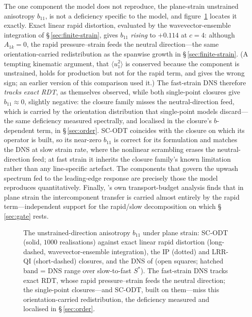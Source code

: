 \documentclass[11pt,a4paper]{article}
\begin{document}
The one component the model does not reproduce, the plane-strain
unstrained anisotropy $b_{11}$, is not a deficiency specific to the
model, and figure~\ref{fig:lr-b11} locates it exactly. Exact linear
rapid distortion, evaluated by the wavevector-ensemble integration of
\S\,\ref{sec:finite-strain}, gives $b_{11}$ \emph{rising} to $+0.114$
at $c=4$: although $A_{1k}=0$, the rapid pressure--strain feeds the
neutral direction---the same orientation-carried redistribution as the
spanwise growth in \S\,\ref{sec:finite-strain}. (A tempting kinematic
argument, that $\langle u_1^2\rangle$ is conserved because the
component is unstrained, holds for production but not for the rapid
term, and gives the wrong sign; an earlier version of this comparison
used it.) The fast-strain DNS therefore \emph{tracks exact RDT}, as
\citeauthor{LeeReynolds1985} themselves observed, while both
single-point closures give $b_{11}\approx0$, slightly negative: the
closure family misses the neutral-direction feed, which is carried by
the orientation distribution that single-point models discard---the
same deficiency measured spectrally, and localised in the closure's
$b$-dependent term, in \S\,\ref{sec:order}. SC-ODT
coincides with the closure on which its operator is built, so its
near-zero $b_{11}$ is correct for its formulation and matches the DNS
at slow strain rate, where the nonlinear scrambling erases the
neutral-direction feed; at fast strain it inherits the closure
family's known limitation rather than any line-specific artefact.
The components that govern the upwash spectrum fed to the leading-edge
response are precisely those the model reproduces quantitatively.
Finally, \citeauthor{LeeReynolds1985}'s own transport-budget analysis
finds that in plane strain the intercomponent transfer is carried almost
entirely by the rapid term---independent support for the rapid/slow
decomposition on which \S\,\ref{sec:gate} rests.

\begin{figure}
  \centering
  \caption{The unstrained-direction anisotropy $b_{11}$ under plane
  strain: SC-ODT (solid, $1000$ realisations)
  against exact linear rapid distortion (long-dashed,
  wavevector-ensemble integration), the IP (dotted) and LRR-QI
  (short-dashed) closures, and the DNS of \citet{LeeReynolds1985} (open
  squares; hatched band = DNS range over slow-to-fast $S^{*}$). The
  fast-strain DNS tracks exact RDT, whose rapid pressure--strain feeds
  the neutral direction; the single-point closures---and SC-ODT, built
  on them---miss this orientation-carried redistribution, the
  deficiency measured and localised in \S\,\ref{sec:order}.}
  \label{fig:lr-b11}
\end{figure}
\end{document}
